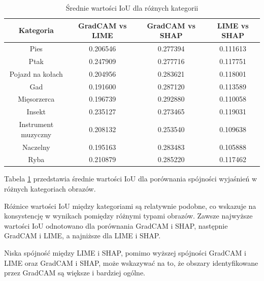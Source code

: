 \begin{table}[h]
	\centering
	\begin{tabular}{|c|c|c|c|}
		\hline
		\textbf{Kategoria}  & \textbf{GradCAM vs LIME} & \textbf{GradCAM vs SHAP} & \textbf{LIME vs SHAP} \\
		\hline
		Pies                & 0.206546                 & 0.277394                 & 0.111613              \\
		\hline
		Ptak                & 0.247909                 & 0.277716                 & 0.117751              \\
		\hline
		Pojazd na kołach    & 0.204956                 & 0.283621                 & 0.118001              \\
		\hline
		Gad                 & 0.191600                 & 0.287120                 & 0.113589              \\
		\hline
		Mięsorzerca         & 0.196739                 & 0.292880                 & 0.110058              \\
		\hline
		Insekt              & 0.235127                 & 0.273465                 & 0.119031              \\
		\hline
		Instrument muzyczny & 0.208132                 & 0.253540                 & 0.109638              \\
		\hline
		Naczelny            & 0.195163                 & 0.283483                 & 0.105888              \\
		\hline
		Ryba                & 0.210879                 & 0.285220                 & 0.117462              \\
		\hline
	\end{tabular}
	\caption{Średnie wartości IoU dla różnych kategorii}
	\label{tab:base_coherence_categories}
\end{table}

Tabela \ref{tab:base_coherence_categories} przedstawia średnie wartości IoU dla porównania spójności wyjaśnień w różnych kategoriach obrazów.

Różnice wartości IoU między kategoriami są relatywnie podobne, co wskazuje na konsystencję w wynikach pomiędzy różnymi typami obrazów.
Zawsze najwyższe wartości IoU odnotowano dla porównania GradCAM i SHAP, następnie GradCAM i LIME, a najniższe dla LIME i SHAP.

Niska spójność między LIME i SHAP, pomimo wyższej spójności GradCAM i LIME oraz GradCAM i SHAP, może wskazywać na to, że obszary identyfikowane przez GradCAM są większe i bardziej ogólne.

